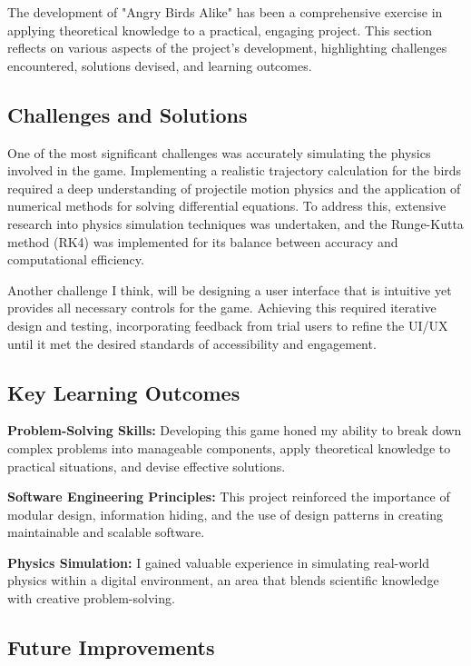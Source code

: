\documentclass[12pt]{article}
\begin{document}
The development of "Angry Birds Alike" has been a comprehensive exercise in applying theoretical knowledge to a practical, engaging project. This section reflects on various aspects of the project's development, highlighting challenges encountered, solutions devised, and learning outcomes.

\subsection{Challenges and Solutions}

One of the most significant challenges was accurately simulating the physics involved in the game. Implementing a realistic trajectory calculation for the birds required a deep understanding of projectile motion physics and the application of numerical methods for solving differential equations. To address this, extensive research into physics simulation techniques was undertaken, and the Runge-Kutta method (RK4) was implemented for its balance between accuracy and computational efficiency.

Another challenge I think, will be designing a user interface that is intuitive yet provides all necessary controls for the game. Achieving this required iterative design and testing, incorporating feedback from trial users to refine the UI/UX until it met the desired standards of accessibility and engagement.

\subsection{Key Learning Outcomes}

\textbf{Problem-Solving Skills:} Developing this game honed my ability to break down complex problems into manageable components, apply theoretical knowledge to practical situations, and devise effective solutions.

\textbf{Software Engineering Principles:} This project reinforced the importance of modular design, information hiding, and the use of design patterns in creating maintainable and scalable software.

\textbf{Physics Simulation:} I gained valuable experience in simulating real-world physics within a digital environment, an area that blends scientific knowledge with creative problem-solving.

\subsection{Future Improvements}
\end{document}
